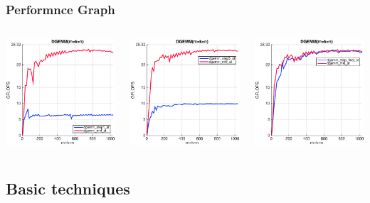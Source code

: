 \documentclass[xcolor=pdflatex,dvipsnames,table]{beamer}
\begin{document}
\begin{frame}[fragile]
\frametitle{Performnce Graph}

\begin{columns}
\begin{center}
\includegraphics[width=2in]{figures/step1_st_ivy.eps}
\end{center}
\begin{center}
\includegraphics[width=2in]{figures/step2_st_ivy.eps}
\end{center}
\begin{center}
\includegraphics[width=2in]{figures/step3_st_ivy.eps}
\end{center}
\end{columns}

\end{frame}


\subsection{Basic techniques}
\end{document}
